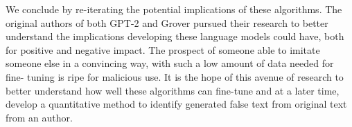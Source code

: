 \documentclass[11pt]{article}
\begin{document}
We conclude by re-iterating the potential implications of these algorithms. The original authors
of both GPT-2 and Grover pursued their research to better understand the implications developing
these language models could have, both for positive and negative impact. The prospect of someone
able to imitate someone else in a convincing way, with such a low amount of data needed for fine-
tuning is ripe for malicious use. It is the hope of this avenue of research to better understand
how well these algorithms can fine-tune and at a later time, develop a quantitative method to
identify generated false text from original text from an author.



\end{document}

